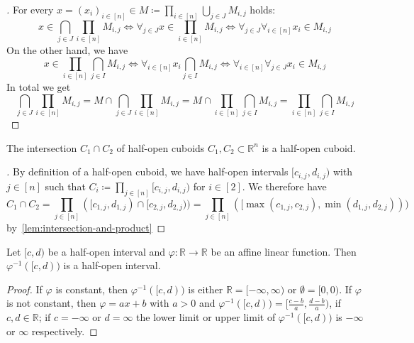 \begin{proof}[]
  For every \(x=(x_i)_{i∈[n]}∈M≔\prod_{i∈[n]}\bigcup_{j∈J}M_{i,j}\) holds:
  \begin{equation*}
   x∈\bigcap_{j∈J}\prod_{i∈[n]}M_{i,j}⇔∀_{j∈J}x∈\prod_{i∈[n]}M_{i,j} ⇔∀_{j∈J}∀_{i∈[n]}x_i∈M_{i,j}
  \end{equation*}
  On the other hand, we have
  \begin{equation*}
    x∈\prod_{i∈[n]}\bigcap_{j∈I}M_{i,j}⇔∀_{i∈[n]}x_i\bigcap_{j∈I}M_{i,j}⇔∀_{i∈[n]}∀_{j∈J}x_i∈M_{i,j}
  \end{equation*}
  In total we get
  \[ \bigcap_{j∈J}\prod_{i∈[n]}M_{i,j}=M∩\bigcap_{j∈J}\prod_{i∈[n]}M_{i,j}=M∩\prod_{i∈[n]}\bigcap_{j∈I}M_{i,j}=\prod_{i∈[n]}\bigcap_{j∈I}M_{i,j} \]
\end{proof}

\begin{lemma}\label{lem:intersection-cuboid}
  The intersection \(C_1∩C_2\) of half-open cuboids \(C_1,C_2⊂ℝ^n\) is a half-open cuboid.
\end{lemma}

\begin{proof}[]
  By definition of a half-open cuboid, we have half-open intervals \([c_{i,j},d_{i,j})\) with \(j∈[n]\) such that \(C_i≔\prod_{j∈[n]}[c_{i,j},d_{i,j})\) for \(i∈[2]\). We therefore have
  \[ C_1∩C_2=\prod_{j∈[n]}([c_{1,j},d_{1,j})∩[c_{2,j},d_{2,j}))=\prod_{j∈[n]}([\max(c_{1,j},c_{2,j}),\min(d_{1,j},d_{2,j}))) \]
  by~\autoref{lem:intersection-and-product}
\end{proof}


\begin{lemma}\label{lem:pre-image-half-open-int}
  Let \([c,d)\) be a half-open interval and \(φ:ℝ→ℝ\) be an affine linear function. Then \(φ^{-1}([c,d))\) is a half-open interval.
\end{lemma}


\begin{proof}
  If \(φ\) is constant, then \(φ^{-1}([c,d))\) is either \(ℝ=[-∞,∞)\) or \(∅=[0,0)\).
  If \(φ\) is not constant, then \(φ=ax+b\) with \(a>0\) and \(φ^{-1}([c,d))=[\frac{c-b}{a},\frac{d-b}{a})\), if \(c,d∈ℝ\); if \(c=-∞\) or \(d=∞\) the lower limit or upper limit of \(φ^{-1}([c,d))\) is \(-∞\) or \(∞\) respectively.
\end{proof}

